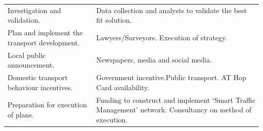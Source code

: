 \documentclass[twoside, a4paper, 11pt]{article}
\begin{document}
\begin{table}[H]
\begin{tabular}{|p{6cm}|p{7cm}|}
			Investigation and validation.                                            & Data collection and analysts to validate the best fit solution.                                                                                                                                                                                                                                                                                                                                                                                                        \\
			Plan and implement the transport development.                            & Lawyers/Surveyors. Execution of strategy.                                                                                                                                                                                                                                                                                                                                                                                                                              \\
			Local public announcement.                                               & Newspapers, media and social media.                                                                                                                                                                                                                                                                                                                                                                                                                                    \\
			Domestic transport behaviour incentives.                                 & Government incentive.Public transport. AT Hop Card availability.                                                                                                                                                                                                                                                                                                                                                                                                       \\
			Preparation for execution of plans.                                      & Funding to construct and implement `Smart Traffic Management' network. Consultancy on method of execution.                                                                                                                                                                                                                                                                                                                                                             \\

\end{tabular}
\end{table}
\end{document}
